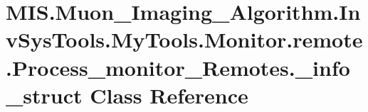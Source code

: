 \hypertarget{classMIS_1_1Muon__Imaging__Algorithm_1_1InvSysTools_1_1MyTools_1_1Monitor_1_1remote_1_1Process__6f9faf649b31b0676bfb490299a32728}{}\section{M\+I\+S.\+Muon\+\_\+\+Imaging\+\_\+\+Algorithm.\+Inv\+Sys\+Tools.\+My\+Tools.\+Monitor.\+remote.\+Process\+\_\+monitor\+\_\+\+Remotes.\+\_\+info\+\_\+struct Class Reference}
\label{classMIS_1_1Muon__Imaging__Algorithm_1_1InvSysTools_1_1MyTools_1_1Monitor_1_1remote_1_1Process__6f9faf649b31b0676bfb490299a32728}
